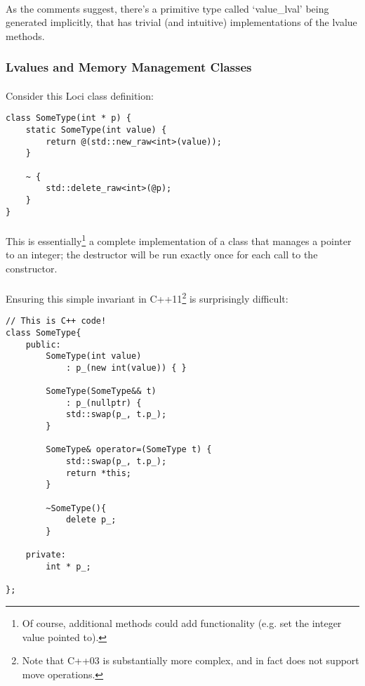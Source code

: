 \documentclass[12pt,twoside,notitlepage]{report}
\begin{document}
\paragraph{}
As the comments suggest, there’s a primitive type called `value\_lval' being generated implicitly, that has trivial (and intuitive) implementations of the lvalue methods.

\subsubsection{Lvalues and Memory Management Classes}

\paragraph{}
Consider this Loci class definition:

\begin{lstlisting}
class SomeType(int * p) {
	static SomeType(int value) {
		return @(std::new_raw<int>(value));
	}
	
	~ {
		std::delete_raw<int>(@p);
	}
}
\end{lstlisting}

\paragraph{}
This is essentially\footnote{Of course, additional methods could add functionality (e.g. set the integer value pointed to).} a complete implementation of a class that manages a pointer to an integer; the destructor will be run exactly once for each call to the constructor.

\paragraph{}
Ensuring this simple invariant in C++11\footnote{Note that C++03 is substantially more complex, and in fact does not support move operations.} is surprisingly difficult:

\begin{lstlisting}
// This is C++ code!
class SomeType{
	public:
		SomeType(int value)
			: p_(new int(value)) { }
		
		SomeType(SomeType&& t) 
			: p_(nullptr) {
			std::swap(p_, t.p_);
		}
		
		SomeType& operator=(SomeType t) {
			std::swap(p_, t.p_);
			return *this;
		}
		
		~SomeType(){
			delete p_;
		}
	
	private:
		int * p_;
	
};
\end{lstlisting}
\end{document}

